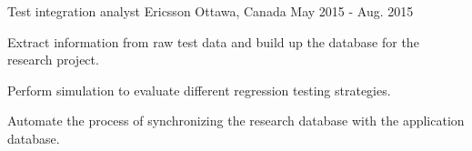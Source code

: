 \documentclass[11pt, a4paper]{awesome-cv} %
\begin{document}
\begin{cventries}
	
	
	\cventry
	{Test integration analyst} %
	{Ericsson} %
	{Ottawa, Canada} %
	{May 2015 - Aug. 2015} %
	{ %
		\begin{cvitems}
			\item {Extract information from raw test data and build up the database for the research project.}
			\item {Perform simulation to evaluate different regression testing strategies.}
			\item {Automate the process of synchronizing the research database with the application database.}
		\end{cvitems}
	}
	
	
	
	
\end{cventries}
%
%
%
%
%

\end{document}
